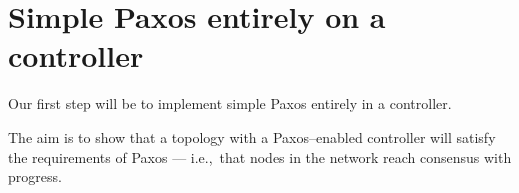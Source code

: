 \chapter{Simple Paxos entirely on a controller}

Our first step will be to implement simple Paxos \cite{Lam01} entirely in a
controller.

The aim is to show that a topology with a Paxos--enabled controller will
satisfy the requirements of Paxos --- i.e.,~that nodes in the network reach
consensus with progress.
